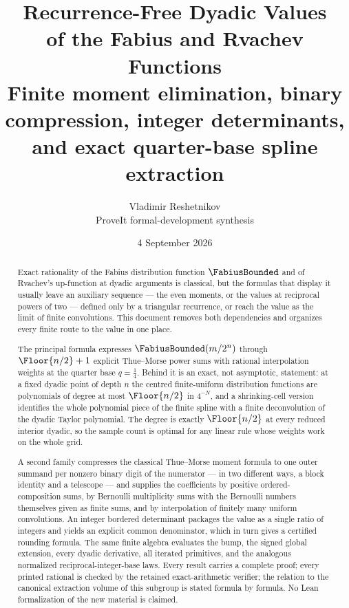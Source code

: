 \documentclass[11pt,oneside]{article}
\theoremstyle{plain}
\theoremstyle{definition}
\theoremstyle{remark}
\newcommand{\Fb}{\FabiusBounded}            %
\begin{document}
\title{\textbf{Recurrence-Free Dyadic Values}\\[0.35em]
  \Large of the Fabius and Rvachev Functions\\[0.6em]
  \large Finite moment elimination, binary compression, integer determinants,\\
  and exact quarter-base spline extraction}
\author{Vladimir Reshetnikov\\
  \small ProveIt formal-development synthesis}
\date{4 September 2026}

\maketitle

\begin{abstract}
Exact rationality of the Fabius distribution function $\Fb$ and of Rvachev's
up-function at dyadic arguments is classical, but the formulas that display
it usually leave an auxiliary sequence --- the even moments, or the values at
reciprocal powers of two --- defined only by a triangular recurrence, or
reach the value as the limit of finite convolutions.  This document removes
both dependencies and organizes every finite route to the value in one
place.

The principal formula expresses $\Fb(m/2^{n})$ through
$\Floor{n/2}+1$ explicit Thue--Morse power sums with rational
interpolation weights at the quarter base $q=\tfrac14$.  Behind it is an
exact, not asymptotic, statement: at a fixed dyadic point of depth $n$ the
centred finite-uniform distribution functions are polynomials of degree at
most $\Floor{n/2}$ in $4^{-N}$, and a shrinking-cell version identifies the
whole polynomial piece of the finite spline with a finite deconvolution of
the dyadic Taylor polynomial.  The degree is exactly $\Floor{n/2}$ at every
reduced interior dyadic, so the sample count is optimal for any linear rule
whose weights work on the whole grid.

A second family compresses the classical Thue--Morse moment formula to one
outer summand per nonzero binary digit of the numerator --- in two different
ways, a block identity and a telescope --- and supplies the coefficients by
positive ordered-composition sums, by Bernoulli multiplicity sums with the
Bernoulli numbers themselves given as finite sums, and by interpolation of
finitely many uniform convolutions.  An integer bordered determinant packages
the value as a single ratio of integers and yields an explicit common
denominator, which in turn gives a certified rounding formula.  The same
finite algebra evaluates the bump, the signed global extension, every dyadic
derivative, all iterated primitives, and the analogous normalized
reciprocal-integer-base laws.  Every result carries a complete proof; every
printed rational is checked by the retained exact-arithmetic verifier; the
relation to the canonical extraction volume of this subgroup is stated
formula by formula.  No Lean formalization of the new material is claimed.
\end{abstract}
\end{document}
